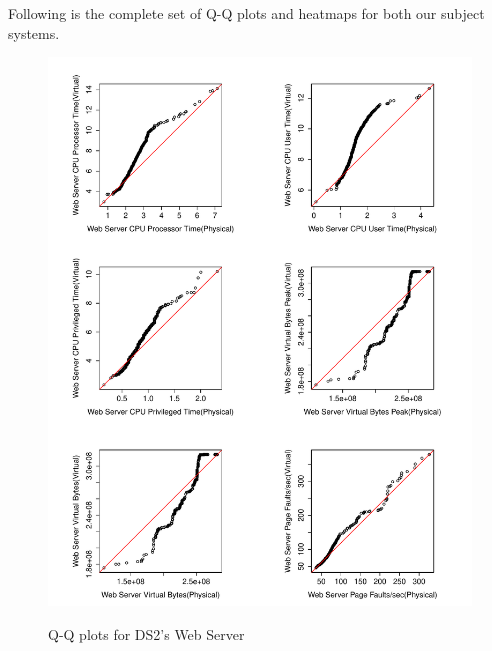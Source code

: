 Following is the complete set of Q-Q plots and heatmaps for both our subject systems.


%
\begin{figure}[tbh]
	\centering
	{\includegraphics[width=1.0\textwidth]{figures/appendix/qq_plots/DS2/Web_Server/First_six.pdf}}
	\caption{Q-Q plots for DS2's Web Server}
\end{figure}

